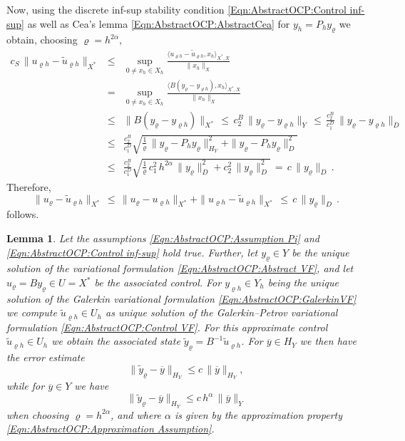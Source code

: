 \documentclass{article}
\newtheorem{lemma}{Lemma}
\numberwithin{equation}{section}
\begin{document}
Now, using the discrete inf-sup stability condition
\eqref{Eqn:AbstractOCP:Control inf-sup}
as well as Cea's lemma \eqref{Eqn:AbstractOCP:AbstractCea} for
$y_h = P_h y_\varrho$ we obtain, choosing $\varrho = h^{2\alpha}$,
\begin{eqnarray*}
  c_S \, \| u_{\varrho h} - \widetilde{u}_{\varrho h} \|_{X^*}
  & \leq & \sup\limits_{0 \neq x_h \in X_h}
           \frac{\langle u_{\varrho h} - \widetilde{u}_{\varrho h},x_h
           \rangle_{X^*,X}}{\| x_h \|_X} \\
  & = & \sup\limits_{0 \neq x_h \in X_h}
        \frac{\langle B(y_\varrho-y_{\varrho h}),x_h
        \rangle_{X^*,X}}{\| x_h \|_X} \\
  & \leq & \| B (y_\varrho - y_{\varrho h}) \|_{X^*} \, \leq \,
           c_2^B \, \| y_\varrho - y_{\varrho h} \|_Y \, \leq \,
           \frac{c_2^B}{c_1^D} \, \| y_\varrho - y_{\varrho h} \|_D \\
  & \leq & \frac{c_2^B}{c_1^D} \sqrt{
           \frac{1}{\varrho} \, \| y_\varrho - P_h y_\varrho \|_{H_Y}^2 +
           \| y_\varrho - P_h y_\varrho \|_D^2 } \\
  & \leq & \frac{c_2^B}{c_1^D} \sqrt{
           \frac{1}{\varrho} \, c_1^2 \, h^{2\alpha} \,
           \| y_\varrho \|_D^2 + c_2^2 \, 
           \| y_\varrho \|^2_D } \, = \, c \, \| y_\varrho \|_D \, .
\end{eqnarray*}
Therefore,
\[
  \| u_\varrho - \widetilde{u}_{\varrho h} \|_{X^*}
  \, \leq \, \| u_\varrho - u_{\varrho h} \|_{X^*} +
  \| u_{\varrho h} - \widetilde{u}_{\varrho h} \|_{X^*}
  \, \leq \, c \, \| y_\varrho \|_D \, .
\]
follows. 
\begin{lemma}
  Let the assumptions \eqref{Eqn:AbstractOCP:Assumption Pi} and
  \eqref{Eqn:AbstractOCP:Control inf-sup} hold true. Further,
  let $y_\varrho \in Y$ be the unique solution of the variational
  formulation \eqref{Eqn:AbstractOCP:Abstract VF}, and let
  $u_\varrho = B y_\varrho \in U = X^*$ be the associated control.
  For $y_{\varrho h} \in Y_h$ being the unique solution of the
  Galerkin variational formulation \eqref{Eqn:AbstractOCP:GalerkinVF}
  we compute $\widetilde{u}_{\varrho h} \in U_h$
  as unique solution of the Galerkin--Petrov variational formulation
  \eqref{Eqn:AbstractOCP:Control VF}. For this
  approximate control $\widetilde{u}_{\varrho h} \in U_h$
  we obtain the associated state
  $\widetilde{y}_\varrho = B^{-1} \widetilde{u}_{\varrho h}$. For
  $\overline{y} \in H_Y$ we then have the error estimate
  \begin{equation}\label{Eqn:AbstractOCP:Final Error 1}
    \| \widetilde{y}_\varrho - \overline{y} \|_{H_Y} \leq c \,
    \| \overline{y} \|_{H_Y},
  \end{equation}
  while for $\overline{y} \in Y$ we have
  \begin{equation}\label{Eqn:AbstractOCP:Final Error 2}
    \| \widetilde{y}_\varrho - \overline{y} \|_{H_Y} \leq c \, h^\alpha \,
    \| \overline{y} \|_Y
  \end{equation}
  when choosing $\varrho = h^{2\alpha}$, and where $\alpha$ is given
  by the approximation property
  \eqref{Eqn:AbstractOCP:Approximation Assumption}.
\end{lemma}
\end{document}
